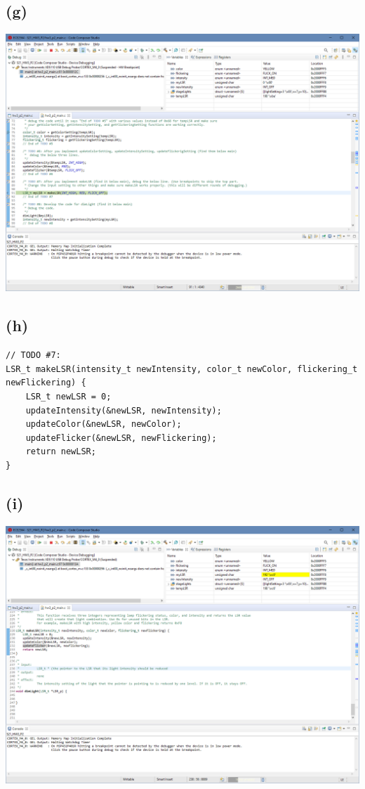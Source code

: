 \documentclass{article}
\begin{document}
\subsection*{(g)}
\begin{center}
    \includegraphics[width = \textwidth]{e.png}
\end{center}
\newpage
\subsection*{(h)}
\begin{center}
         \lstset{language=C}
        \lstset{frame=lines}
        \lstset{basicstyle=\footnotesize}
        \begin{lstlisting}
// TODO #7:
LSR_t makeLSR(intensity_t newIntensity, color_t newColor, flickering_t newFlickering) {
    LSR_t newLSR = 0;
    updateIntensity(&newLSR, newIntensity);
    updateColor(&newLSR, newColor);
    updateFlicker(&newLSR, newFlickering);
    return newLSR;
}
        \end{lstlisting}
\end{center}
\subsection*{(i)}
\begin{center}
    \includegraphics[width = \textwidth]{i.png}
\end{center}
\newpage
\end{document}
